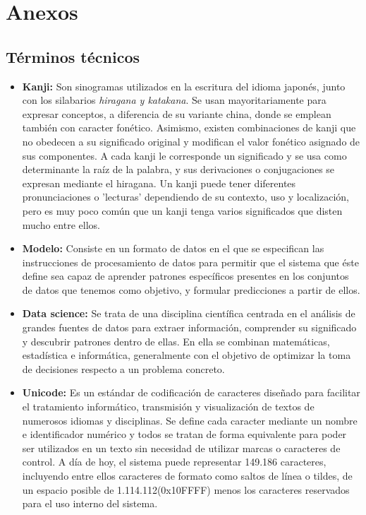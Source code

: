 \documentclass{article}
\begin{document}
\newpage



\section{Anexos}

\subsection{Términos técnicos}
\label{sec:terms}
\begin{itemize}
	\item \textbf{Kanji:} Son sinogramas utilizados en la escritura del idioma japonés, junto con los silabarios \textit{hiragana y katakana}. Se usan mayoritariamente para expresar conceptos, a diferencia de su variante china, donde se emplean también con caracter fonético. Asimismo, existen combinaciones de kanji  que no obedecen a su significado original y modifican el valor fonético asignado de sus componentes. A cada kanji le corresponde un significado y se usa como determinante la raíz de la palabra, y sus derivaciones o conjugaciones se expresan mediante el hiragana. Un kanji puede tener diferentes pronunciaciones o 'lecturas' dependiendo de su contexto, uso y localización, pero es muy poco común que un kanji tenga varios significados que disten mucho entre ellos.
	\item \textbf{Modelo:} Consiste en un formato de datos en el que se especifican las instrucciones de procesamiento de datos para permitir que el sistema que éste define sea capaz de aprender patrones específicos presentes en los conjuntos de datos que tenemos como objetivo, y formular predicciones a partir de ellos.
	\item \textbf{Data science:} Se trata de una disciplina científica centrada en el análisis de grandes fuentes de datos para extraer información, comprender su significado y descubrir patrones dentro de ellas. En ella se combinan matemáticas, estadística  e informática, generalmente con el objetivo de optimizar la toma de decisiones respecto a un problema concreto.
	\item \textbf{Unicode:} Es un estándar de codificación de caracteres diseñado para facilitar el tratamiento informático, transmisión y visualización de textos de numerosos idiomas y disciplinas. Se define cada caracter mediante un nombre e identificador numérico y todos se tratan de forma equivalente para poder ser utilizados en un texto sin necesidad de utilizar marcas o caracteres de control. A día de hoy, el sistema puede representar 149.186 caracteres, incluyendo entre ellos caracteres de formato como saltos de línea o tildes, de un espacio posible de 1.114.112(0x10FFFF) menos los caracteres reservados para el uso interno del sistema.

\end{itemize}
\end{document}
